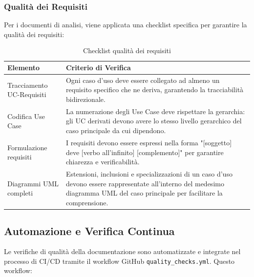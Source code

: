 \documentclass[a4paper,11pt,oneside]{scrartcl}
\begin{document}
\subsubsection{Qualità dei Requisiti}

Per i documenti di analisi, viene applicata una checklist specifica per garantire la qualità dei requisiti:

\begin{table}[H]
    \centering
    \renewcommand{\arraystretch}{1.4}
    \begin{tabularx}{\textwidth}{@{}p{}X@{}}
        \toprule
        \textbf{Elemento}         & \textbf{Criterio di Verifica}                                                                                                                                                     \\
        \midrule
        Tracciamento UC-Requisiti & Ogni caso d'uso deve essere collegato ad almeno un requisito specifico che ne deriva, garantendo la tracciabilità bidirezionale.                                                  \\
        \midrule
        Codifica Use Case         & La numerazione degli Use Case deve rispettare la gerarchia: gli UC derivati devono avere lo stesso livello gerarchico del caso principale da cui dipendono.                       \\
        \midrule
        Formulazione requisiti    & I requisiti devono essere espressi nella forma "[soggetto] deve [verbo all'infinito] [complemento]" per garantire chiarezza e verificabilità.                                     \\
        \midrule
        Diagrammi UML completi    & Estensioni, inclusioni e specializzazioni di un caso d'uso devono essere rappresentate all'interno del medesimo diagramma UML del caso principale per facilitare la comprensione. \\
        \bottomrule
    \end{tabularx}
    \caption{Checklist qualità dei requisiti}
\end{table}

\subsection{Automazione e Verifica Continua}

Le verifiche di qualità della documentazione sono automatizzate e integrate nel processo di CI/CD tramite il workflow GitHub \texttt{quality\_checks.yml}. Questo workflow:
\end{document}
